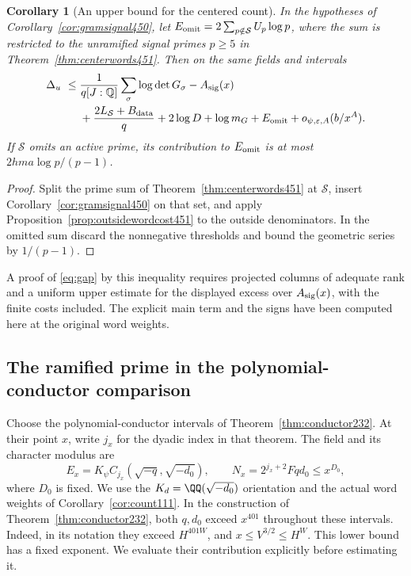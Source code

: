 \documentclass[a4paper,11pt]{article}
\newtheorem{corollary}[proposition]{Corollary}
\theoremstyle{definition}
\theoremstyle{remark}
\numberwithin{equation}{section}
\begin{document}
\begin{corollary}[An upper bound for the centered count]\leavevmode
\label{cor:centerheight451}
In the hypotheses of Corollary~\ref{cor:gramsignal450}, let
\(E_{\rm omit}=2\sum_{p\notin\mathcal S}U_p\log p\), where
the sum is restricted to the unramified signal primes \(p\ge5\)
in Theorem~\ref{thm:centerwords451}. Then on the same fields
and intervals
\[
 \begin{split}
 \Delta_u\ \le{}&
   \frac1{q[J:\mathbb Q]}\sum_\sigma\log\det G_\sigma
       -A_{\rm sig}(x)\\
 &+\frac{2L_{\mathcal S}+B_{\rm data}}q+
          2\log D+\log m_G+E_{\rm omit}
          +o_{\psi,\varepsilon,A}(b/x^A).
 \end{split}
\]
If \(\mathcal S\) omits an active prime, its contribution to
\(E_{\rm omit}\) is at most \(2hma\log p/(p-1)\).
\end{corollary}
\begin{proof}
Split the prime sum of Theorem~\ref{thm:centerwords451}
at \(\mathcal S\), insert Corollary~\ref{cor:gramsignal450}
on that set, and apply Proposition~\ref{prop:outsidewordcost451}
to the outside denominators. In the omitted sum discard the
nonnegative thresholds and bound the geometric series by \(1/(p-1)\).
\end{proof}

A proof of \eqref{eq:gap} by this inequality requires projected
columns of adequate rank and a uniform upper estimate for the
displayed excess over \(A_{\rm sig}(x)\), with the finite
costs included. The explicit main term and the signs have been
computed here at the original word weights.


\subsection{The ramified prime in the polynomial-conductor comparison}
\label{sec:ramifiedcenter460}

Choose the polynomial-conductor intervals of
Theorem~\ref{thm:conductor232}. At their point \(x\), write \(j_x\)
for the dyadic index in that theorem. The field and its character
modulus are
\[
 E_x=K_\psi C_{j_x}(\sqrt{-q},\sqrt{-d_0}),\qquad
 N_x=2^{j_x+2}Fqd_0\le x^{D_0},
\]
where \(D_0\) is fixed. We use the \(K_d=\QQ(\sqrt{-d_0})\)
orientation and the actual word weights of
Corollary~\ref{cor:count111}. In the construction of
Theorem~\ref{thm:conductor232}, both \(q,d_0\) exceed \(x^{401}\)
throughout these intervals. Indeed, in its notation they exceed
\(H^{401W}\), and \(x\le V^{3/2}\le H^W\). This lower bound
has a fixed exponent. We evaluate their contribution explicitly
before estimating it.
\end{document}
